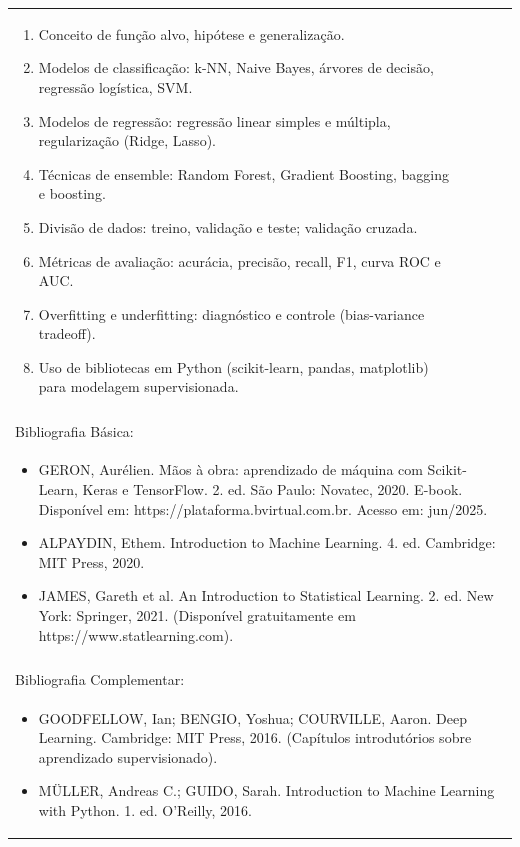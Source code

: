 \documentclass[11pt]{article}
\begin{document}
\begin{center}
\begin{longtable}{|p{4cm}|p{4cm}|p{4cm}|p{4cm}|}
{\begin{enumerate}
\item Conceito de função alvo, hipótese e generalização.
\item Modelos de classificação: k-NN, Naive Bayes, árvores de decisão, regressão logística, SVM.
\item Modelos de regressão: regressão linear simples e múltipla, regularização (Ridge, Lasso).
\item Técnicas de ensemble: Random Forest, Gradient Boosting, bagging e boosting.
\item Divisão de dados: treino, validação e teste; validação cruzada.
\item Métricas de avaliação: acurácia, precisão, recall, F1, curva ROC e AUC.
\item Overfitting e underfitting: diagnóstico e controle (bias-variance tradeoff).
\item Uso de bibliotecas em Python (scikit-learn, pandas, matplotlib) para modelagem supervisionada.\end{enumerate}}\\
\multicolumn{4}{|p{16cm}|}{}\\
\hline
\multicolumn{4}{|p{16cm}|}{Bibliografia Básica:}\\
\multicolumn{4}{|p{\dimexpr 16cm + 6\tabcolsep\relax}|}{%
\begin{itemize}\item GERON, Aurélien. Mãos à obra: aprendizado de máquina com Scikit-Learn, Keras e TensorFlow. 2. ed. São Paulo: Novatec, 2020. E-book. Disponível em: https://plataforma.bvirtual.com.br. Acesso em: jun/2025.
\item ALPAYDIN, Ethem. Introduction to Machine Learning. 4. ed. Cambridge: MIT Press, 2020.
\item JAMES, Gareth et al. An Introduction to Statistical Learning. 2. ed. New York: Springer, 2021. (Disponível gratuitamente em https://www.statlearning.com).\end{itemize}}\\
\multicolumn{4}{|p{16cm}|}{}\\
\hline
\multicolumn{4}{|p{16cm}|}{Bibliografia Complementar:}\\
\multicolumn{4}{|p{\dimexpr 16cm + 6\tabcolsep\relax}|}{%
\begin{itemize}\item GOODFELLOW, Ian; BENGIO, Yoshua; COURVILLE, Aaron. Deep Learning. Cambridge: MIT Press, 2016. (Capítulos introdutórios sobre aprendizado supervisionado).
\item MÜLLER, Andreas C.; GUIDO, Sarah. Introduction to Machine Learning with Python. 1. ed. O'Reilly, 2016.

\end{itemize}}
\end{longtable}
\end{center}
\end{document}
